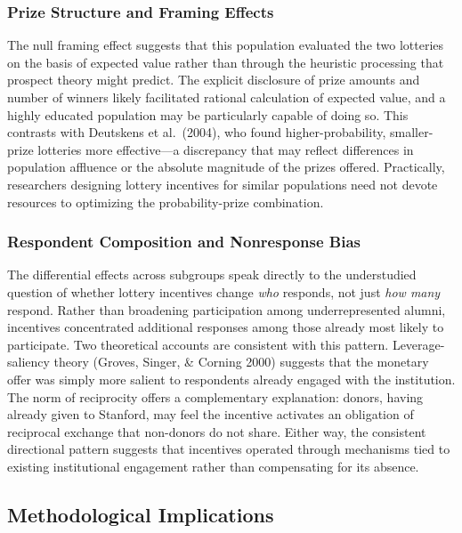 \documentclass[12pt]{article}
\begin{document}
\subsubsection{Prize Structure and Framing Effects}

The null framing effect suggests that this population evaluated the two lotteries on the basis of expected value rather than through the heuristic processing that prospect theory might predict. The explicit disclosure of prize amounts and number of winners likely facilitated rational calculation of expected value, and a highly educated population may be particularly capable of doing so. This contrasts with Deutskens et al.\ (2004), who found higher-probability, smaller-prize lotteries more effective---a discrepancy that may reflect differences in population affluence or the absolute magnitude of the prizes offered. Practically, researchers designing lottery incentives for similar populations need not devote resources to optimizing the probability-prize combination.

\subsubsection{Respondent Composition and Nonresponse Bias}

The differential effects across subgroups speak directly to the understudied question of whether lottery incentives change \textit{who} responds, not just \textit{how many} respond. Rather than broadening participation among underrepresented alumni, incentives concentrated additional responses among those already most likely to participate. Two theoretical accounts are consistent with this pattern. Leverage-saliency theory (Groves, Singer, \& Corning 2000) suggests that the monetary offer was simply more salient to respondents already engaged with the institution. The norm of reciprocity offers a complementary explanation: donors, having already given to Stanford, may feel the incentive activates an obligation of reciprocal exchange that non-donors do not share. Either way, the consistent directional pattern suggests that incentives operated through mechanisms tied to existing institutional engagement rather than compensating for its absence.

\subsection{Methodological Implications}
\end{document}
